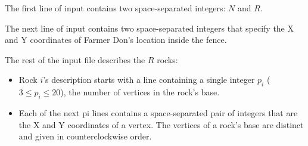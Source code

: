 The first line of input contains two space-separated integers: $N$ and $R$. 

The next line of input contains two space-separated integers that specify the X and Y coordinates of Farmer Don's location inside the fence.

The rest of the input file describes the $R$ rocks: 

\begin{itemize}
\item Rock $i$'s description starts with a line containing a single integer $p_i$ ($3 \leq p_i \leq 20$), the number of vertices in the rock's base.

\item Each of the next pi lines contains a space-separated pair of integers that are the X and Y coordinates of a vertex. The vertices of a rock's base are distinct and given in counterclockwise order.
\end{itemize}